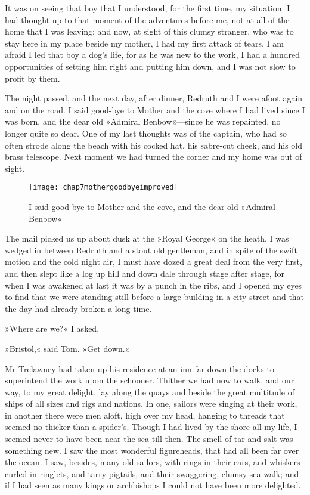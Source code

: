 It was on seeing that boy that I understood, for the first time, my situation. I had thought up to that moment of the adventures before me, not at all of the home that I was leaving; and now, at sight of this clumsy stranger, who was to stay here in my place beside my mother, I had my first attack of tears. I am afraid I led that boy a dog's life, for as he was new to the work, I had a hundred opportunities of setting him right and putting him down, and I was not slow to profit by them.

 

The night passed, and the next day, after dinner, Redruth and I were afoot again and on the road. I said good-bye to Mother and the cove where I had lived since I was born, and the dear old »Admiral Benbow«—since he was repainted, no longer quite so dear. One of my last thoughts was of the captain, who had so often strode along the beach with his cocked hat, his sabre-cut cheek, and his old brass telescope. Next moment we had turned the corner and my home was out of sight.

\begin{figure}[p]
\centering
\texttt{[image: chap7mothergoodbyeimproved]}
\caption[I said good-bye to Mother]{I said good-bye to Mother and the cove, and the dear old »Admiral Benbow«}
\end{figure}


The mail picked us up about dusk at the »Royal George« on the heath. I was wedged in between Redruth and a stout old gentleman, and in spite of the swift motion and the cold night air, I must have dozed a great deal from the very first, and then slept like a log up hill and down dale through stage after stage, for when I was awakened at last it was by a punch in the ribs, and I opened my eyes to find that we were standing still before a large building in a city street and that the day had already broken a long time.

»Where are we?« I asked.

»Bristol,« said Tom. »Get down.«

Mr Trelawney had taken up his residence at an inn far down the docks to superintend the work upon the schooner. Thither we had now to walk, and our way, to my great delight, lay along the quays and beside the great multitude of ships of all sizes and rigs and nations. In one, sailors were singing at their work, in another there were men aloft, high over my head, hanging to threads that seemed no thicker than a spider's. Though I had lived by the shore all my life, I seemed never to have been near the sea till then. The smell of tar and salt was something new. I saw the most wonderful figureheads, that had all been far over the ocean. I saw, besides, many old sailors, with rings in their ears, and whiskers curled in ringlets, and tarry pigtails, and their swaggering, clumsy sea-walk; and if I had seen as many kings or archbishops I could not have been more delighted.

